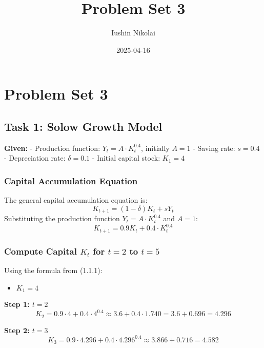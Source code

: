 \documentclass[
]{article}
\title{Problem Set 3}
\author{Iushin Nikolai}
\date{2025-04-16}
\providecommand{\tightlist}{%
  \setlength{\itemsep}{0pt}\setlength{\parskip}{0pt}}
\begin{document}
\maketitle

{
\setcounter{tocdepth}{2}
\tableofcontents
}
\section{Problem Set 3}\label{problem-set-3}

\subsection{Task 1: Solow Growth Model}\label{task-1-solow-growth-model}

\textbf{Given:} - Production function: \(Y_t = A \cdot K_t^{0.4}\),
initially \(A = 1\) - Saving rate: \(s = 0.4\) - Depreciation rate:
\(\delta = 0.1\) - Initial capital stock: \(K_1 = 4\)

\subsubsection{Capital Accumulation
Equation}\label{capital-accumulation-equation}

The general capital accumulation equation is: \[
K_{t+1} = (1 - \delta)K_t + sY_t
\] Substituting the production function \(Y_t = A \cdot K_t^{0.4}\) and
\(A = 1\): \[
K_{t+1} = 0.9K_t + 0.4 \cdot K_t^{0.4}
\]

\subsubsection{\texorpdfstring{Compute Capital \(K_t\) for \(t = 2\) to
\(t = 5\)}{Compute Capital K\_t for t = 2 to t = 5}}\label{compute-capital-k_t-for-t-2-to-t-5}

Using the formula from (1.1.1):

\begin{itemize}
\tightlist
\item
  \(K_1 = 4\)
\end{itemize}

\textbf{Step 1: \(t = 2\)}\\
\[
K_2 = 0.9 \cdot 4 + 0.4 \cdot 4^{0.4} \approx 3.6 + 0.4 \cdot 1.740 = 3.6 + 0.696 = 4.296
\]

\textbf{Step 2: \(t = 3\)}\\
\[
K_3 = 0.9 \cdot 4.296 + 0.4 \cdot 4.296^{0.4} \approx 3.866 + 0.716 = 4.582
\]
\end{document}
